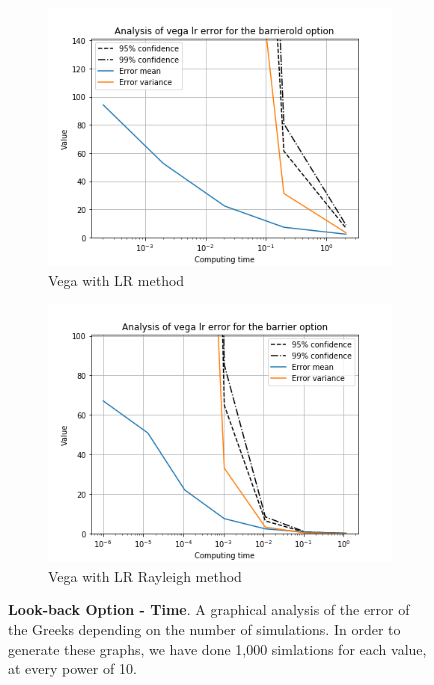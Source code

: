 \documentclass[11pt,a4paper,fleqn]{article}
\begin{document}
\begin{figure}[h!]
      \begin{subfigure}[b]{0.45\textwidth}
          \includegraphics[width=\textwidth]{graphs/barrieroldvegalrtime.png}
          \caption{Vega with LR method}
      \end{subfigure}
      \begin{subfigure}[b]{0.45\textwidth}
          \includegraphics[width=\textwidth]{graphs/barriervegalrtime.png}
          \caption{Vega with LR Rayleigh method}
      \end{subfigure}


      \caption{\textbf{Look-back Option - Time}. A graphical analysis of the error of the Greeks depending on the number of simulations. In order to generate these graphs, we have done 1,000 simlations for each value, at every power of 10.}
\end{figure}
\end{document}
